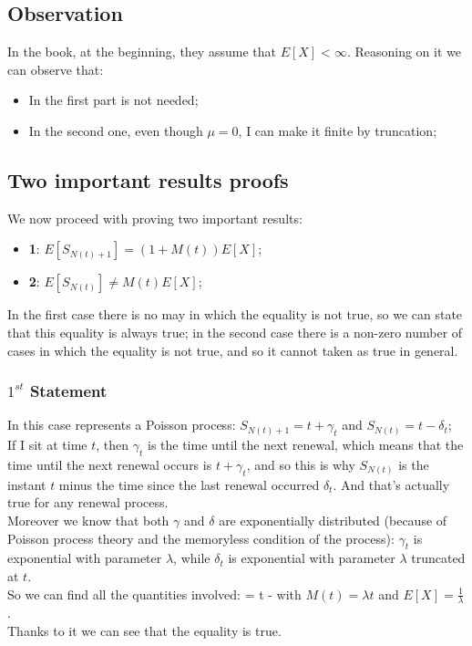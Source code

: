 	\subsection*{Observation}
	In the book, at the beginning, they assume that $E[X] < \infty$. Reasoning on it we can observe that:
	\begin{itemize}
	\item In the first part is not needed;
	\item In the second one, even though $\mu = 0$, I can make it finite by truncation;
	\end{itemize}
	\subsection{Two important results proofs}
	We now proceed with proving two important results:
	\begin{itemize}
	\item \textbf{1}: $E[S_{N(t)+1}] = (1+M(t))E[X]$;
	\item \textbf{2}: $E[S_{N(t)}] \ne M(t)E[X]$;
	\end{itemize}
	In the first case there is no may in which the equality is not true, so we can state that this equality is always true; in the second case there is a non-zero number of cases in which the equality is not true, and so it cannot taken as true in general.
	\subsubsection*{$1^{st}$ Statement}
	In this case represents a Poisson process: $S_{N(t)+1} = t + \gamma_t$ and $S_{N(t)} = t - \delta_t$;\\
	If I sit at time $t$, then $\gamma_t$ is the time until the next renewal, which means that the time until the next renewal occurs is $t + \gamma_t$, and so this is why $S_{N(t)}$ is the instant $t$ minus the time since the last renewal occurred $\delta_t$. And that's actually true for any renewal process.\\
	Moreover we know that both $\gamma$ and $\delta$ are exponentially distributed (because of Poisson process theory and the memoryless condition of the process): $\gamma_t$ is exponential with parameter $\lambda$, while $\delta_t$ is exponential with parameter $\lambda$ truncated at $t$.\\
	So we can find all the quantities involved:%
	\beq
	\exp\left[S_{N(t)+1} = t + \frac{1}{\lambda}\right] \qquad \exp\left[S_{N(t)}\right] = t - 
	\eeq
	with $M(t) = \lambda t$ and $E[X] = \frac{1}{\lambda}$.\\
	Thanks to it we can see that the equality is true.
